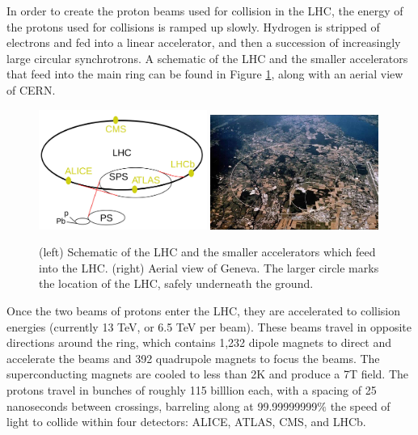 In order to create the proton beams used for collision in the LHC, the energy of the protons used for collisions is ramped up slowly. Hydrogen is stripped of electrons and fed into a linear accelerator, and then a succession of increasingly large circular synchrotrons. A schematic of the LHC and the smaller accelerators that feed into the main ring can be found in Figure \ref{Fig:Detect:LHC}, along with an aerial view of CERN.
\begin{figure}[h!]
    \centering
        \includegraphics[width=0.49\textwidth]{F3/LHC}
        \includegraphics[width=0.49\textwidth]{F3/LHC2}
        \caption{(left) Schematic of the LHC and the smaller accelerators which feed into the LHC. (right) Aerial view of Geneva. The larger circle marks the location of the LHC, safely underneath the ground.}
        \label{Fig:Detect:LHC}
\end{figure}
Once the two beams of protons enter the LHC, they are accelerated to collision energies (currently 13 TeV, or 6.5 TeV per beam). These beams travel in opposite directions around the ring, which contains 1,232 dipole magnets to direct and accelerate the beams and 392 quadrupole magnets to focus the beams. The superconducting magnets are cooled to less than 2K and produce a 7T field. The protons travel in bunches of roughly 115 billlion each, with a spacing of 25 nanoseconds between crossings, barreling along at 99.99999999$\%$ the speed of light to collide within four detectors: ALICE, ATLAS, CMS, and LHCb.

